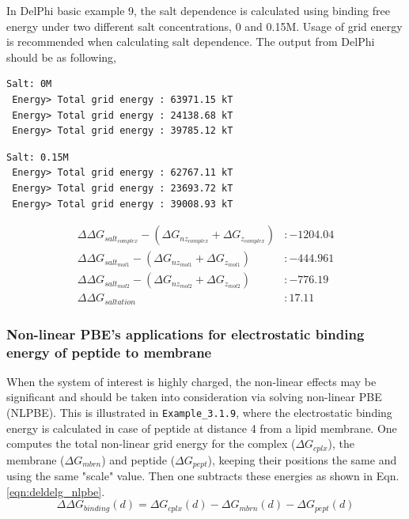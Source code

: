 \documentclass[9pt,tutorial]{livecoms}
\begin{document}
In DelPhi basic example 9, the salt dependence is calculated using binding free energy under two different salt concentrations, 0 and 0.15M. Usage of grid energy is recommended when calculating salt dependence. The output from DelPhi should be as following,

\begin{verbatim}
Salt: 0M 
 Energy> Total grid energy : 63971.15 kT
 Energy> Total grid energy : 24138.68 kT
 Energy> Total grid energy : 39785.12 kT
\end{verbatim}

\begin{verbatim}
Salt: 0.15M
 Energy> Total grid energy : 62767.11 kT
 Energy> Total grid energy : 23693.72 kT
 Energy> Total grid energy : 39008.93 kT
\end{verbatim}

\begin{equation}
\begin{aligned}
\Delta \Delta G_{salt_{complex}} - (\Delta G_{nz_{complex}} + \Delta G_{z_{complex}}) &: -1204.04 \nonumber \\
\Delta\Delta G_{salt_{mol1}} - (\Delta G_{nz_{mol1}} + \Delta G_{z_{mol1}}) &: -444.961 \nonumber \\
\Delta\Delta G_{salt_{mol2}} - (\Delta G_{nz_{mol2}} + \Delta G_{z_{mol2}}) &: -776.19 \nonumber \\
\Delta\Delta G_{saltation} &: 17.11 \nonumber 
\end{aligned}
\end{equation}

\subsubsection{Non-linear PBE's applications for electrostatic binding energy of peptide to membrane}
When the system of interest is highly charged, the non-linear effects may be significant and should be taken into consideration via solving non-linear PBE (NLPBE). This is illustrated in \texttt{Example\_3.1.9}, where the electrostatic binding energy is calculated in case of peptide at distance 4 \text{\AA} from a lipid membrane. One computes the total non-linear grid energy for the complex ($ \Delta G_{cplx}$), the membrane ($ \Delta G_{mbrn}$) and peptide ($ \Delta G_{pept} $), keeping their positions the same and using the same "scale" value. Then one subtracts these energies as shown in Eqn. \ref{eqn:deldelg_nlpbe}.
\begin{equation}\label{eqn:deldelg_nlpbe}
\Delta\Delta G_{binding}(d) = \Delta G_{cplx}(d) - \Delta G_{mbrn}(d) - \Delta G_{pept}(d)
\end{equation}
\end{document}
